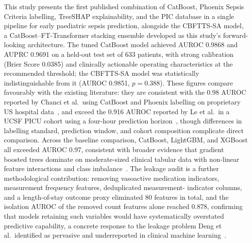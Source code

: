 \documentclass[final,3p,times]{elsarticle}
\begin{document}
This study presents the first published combination of CatBoost, Phoenix
Sepsis Criteria labelling, TreeSHAP explainability, and the PIC database in
a single pipeline for early paediatric sepsis prediction, alongside the CBFTTS-SA
model, a CatBoost--FT-Transformer stacking ensemble developed as this
study's forward-looking architecture. The tuned CatBoost model achieved
AUROC 0.9868 and AUPRC 0.9691 on a held-out test set of 633 patients, with
strong calibration (Brier Score 0.0385) and clinically actionable operating
characteristics at the recommended threshold; the CBFTTS-SA model was statistically
indistinguishable from it (AUROC 0.9851, $p = 0.388$). These figures compare
favourably with the existing literature: they are consistent with the 0.98
AUROC reported by Chanci et al.\ using CatBoost and Phoenix labelling on
proprietary US hospital data~\cite{chanci2025}, and exceed the 0.916 AUROC
reported by Le et al.\ in a UCSF PICU cohort using a four-hour prediction
horizon~\cite{le2019}, though differences in labelling standard, prediction
window, and cohort composition complicate direct comparison. Across the
baseline comparison, CatBoost, LightGBM, and XGBoost all exceeded AUROC
0.97, consistent with broader evidence that gradient boosted trees dominate
on moderate-sized clinical tabular data with non-linear feature interactions
and class imbalance~\cite{gorishniy2021, fleuren2020}. The leakage audit is
a further methodological contribution: removing vasoactive medication
indicators, measurement frequency features, deduplicated measurement-
indicator columns, and a length-of-stay outcome proxy eliminated 80
features in total, and
the isolation AUROC of the removed count features alone reached 0.878,
confirming that models retaining such variables would have systematically
overstated predictive capability, a concrete response to the leakage
problem Deng et al.\ identified as pervasive and underreported in clinical
machine learning~\cite{deng2022}.
\end{document}
